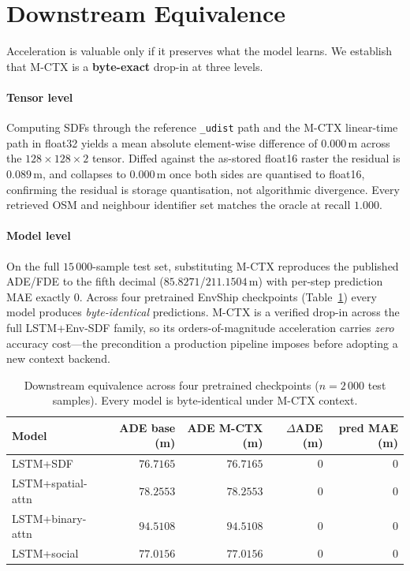 \section{Downstream Equivalence}\label{sec:downstream}

Acceleration is valuable only if it preserves what the model learns. We
establish that M-CTX is a \textbf{byte-exact} drop-in at three levels.

\paragraph*{Tensor level}
Computing SDFs through the reference \texttt{\_udist} path and the M-CTX
linear-time path in float32 yields a mean absolute element-wise difference
of $0.000$\,m across the $128\!\times\!128\!\times\!2$ tensor. Diffed
against the as-stored float16 raster the residual is $0.089$\,m, and
collapses to $0.000$\,m once both sides are quantised to float16,
confirming the residual is storage quantisation, not algorithmic
divergence. Every retrieved OSM and neighbour identifier set matches the
oracle at recall $1.000$.

\paragraph*{Model level}
On the full $15\,000$-sample test set, substituting M-CTX reproduces the
published ADE/FDE to the fifth decimal ($85.8271$/$211.1504$\,m) with
per-step prediction MAE exactly $0$. Across four pretrained EnvShip
checkpoints (Table~\ref{tab:multi-model}) every model produces
\emph{byte-identical} predictions. M-CTX is a verified drop-in across the
full LSTM+Env-SDF family, so its orders-of-magnitude acceleration carries
\emph{zero} accuracy cost---the precondition a production pipeline imposes
before adopting a new context backend.

\begin{table}[t]
\centering
\caption{Downstream equivalence across four pretrained checkpoints
($n{=}2\,000$ test samples). Every model is byte-identical under M-CTX
context.}\label{tab:multi-model}
\small
\setlength{\tabcolsep}{4pt}
\begin{tabular}{lrrrr}
\toprule
Model & ADE base (m) & ADE M-CTX (m) & $\Delta$ADE (m) & pred MAE (m)\\
\midrule
LSTM+SDF          & $76.7165$ & $76.7165$ & $0$ & $0$ \\
LSTM+spatial-attn & $78.2553$ & $78.2553$ & $0$ & $0$ \\
LSTM+binary-attn  & $94.5108$ & $94.5108$ & $0$ & $0$ \\
LSTM+social       & $77.0156$ & $77.0156$ & $0$ & $0$ \\
\bottomrule
\end{tabular}
\setlength{\tabcolsep}{6pt}
\end{table}
